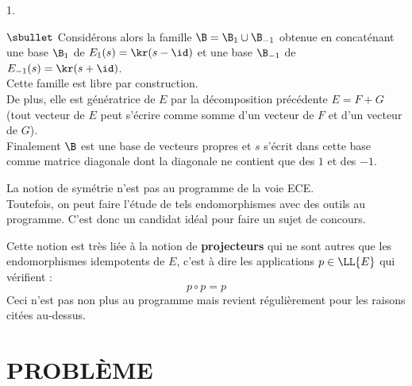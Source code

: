 \documentclass[11pt]{article}%
\begin{document}
\begin{noliste}{1.}
\begin{remark}
\begin{noliste}{$\sbullet$}
    Considérons alors la famille $\B = \B_1 \cup \B_{-1}$ obtenue en
    concaténant une base $\B_1$ de $E_1(s) = \kr(s-\id)$ et une base
    $\B_{-1}$ de $E_{-1}(s) = \kr(s+\id)$.\\
    Cette famille est libre par construction.\\
    De plus, elle est génératrice de $E$ par la décomposition
    précédente $E = F + G$ (tout vecteur de $E$ peut s'écrire comme
    somme d'un vecteur de $F$ et d'un vecteur de $G$).\\[.2cm]
    Finalement $\B$ est une base de vecteurs propres et $s$ s'écrit
    dans cette base comme matrice diagonale dont la diagonale ne
    contient que des $1$ et des $-1$.

  \item La notion de symétrie n'est pas au programme de la voie ECE.\\
    Toutefois, on peut faire l'étude de tels endomorphismes avec des
    outils au programme. C'est donc un candidat idéal pour faire un
    sujet de concours.

  \item Cette notion est très liée à la notion de {\bf projecteurs}
    qui ne sont autres que les endomorphismes idempotents de $E$,
    c'est à dire les applications $p \in \LL{E}$ qui vérifient :
    \[
    p \circ p = p
    \]
    Ceci n'est pas non plus au programme mais revient
    régulièrement pour les raisons citées au-dessus.
  \end{noliste}
\end{remark}%
\end{noliste}


\newpage


\section*{PROBLÈME}
\end{document}
